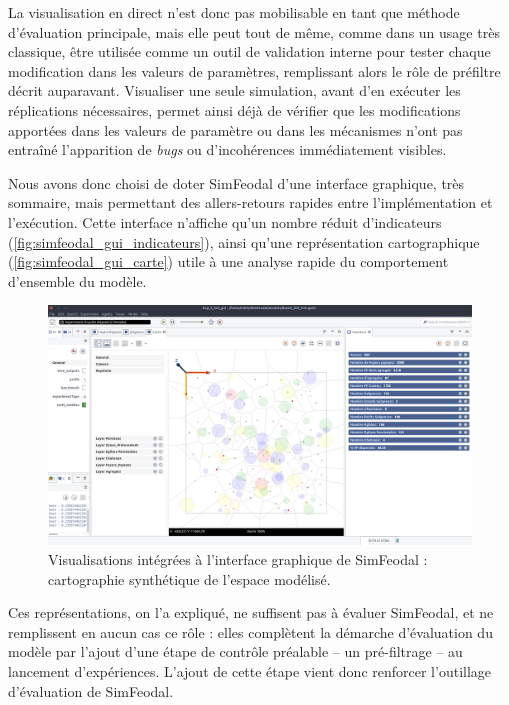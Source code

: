 	La visualisation en direct n'est donc pas mobilisable en tant que méthode d'évaluation principale, mais elle peut tout de même, comme dans un usage très classique, être utilisée comme un outil de validation interne pour tester chaque modification dans les valeurs de paramètres, remplissant alors le rôle de \og préfiltre\fg{} décrit auparavant.
	Visualiser une seule simulation, avant d'en exécuter les réplications nécessaires, permet ainsi déjà de vérifier que les modifications apportées dans les valeurs de paramètre ou dans les mécanismes n'ont pas entraîné l'apparition de \textit{bugs} ou d'incohérences immédiatement visibles.

	Nous avons donc choisi de doter SimFeodal d'une interface graphique, très sommaire, mais permettant des allers-retours rapides entre l'implémentation et l'exécution.
	Cette interface n'affiche qu'un nombre réduit d'indicateurs (\autoref{fig:simfeodal_gui_indicateurs}), ainsi qu'une représentation cartographique (\autoref{fig:simfeodal_gui_carte}) utile à une analyse rapide du comportement d'ensemble du modèle.

\begin{figure}[H]
	\captionsetup{width=\linewidth}
	\includegraphics[width=\linewidth]{img/SimFeodal_GUI_carte.png}
	\caption{Visualisations intégrées à l'interface graphique de SimFeodal : cartographie synthétique de l'espace modélisé.}
	\label{fig:simfeodal_gui_carte}
\end{figure}

	Ces représentations, on l'a expliqué, ne suffisent pas à évaluer SimFeodal, et ne remplissent en aucun cas ce rôle : elles complètent la démarche d'évaluation du modèle par l'ajout d'une étape de contrôle préalable -- un pré-filtrage -- au lancement d'expériences. L'ajout de cette étape vient donc renforcer l'outillage d'évaluation de SimFeodal.

